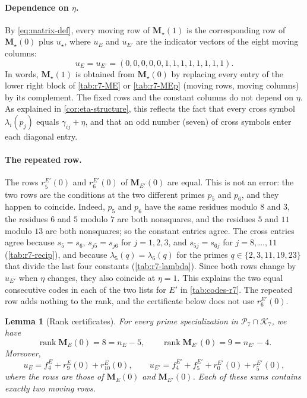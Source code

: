 \documentclass[12pt,oneside,openany]{book}
\theoremstyle{definition}
\theoremstyle{plain}
\numberwithin{equation}{chapter}
\theoremstyle{plain}
\newtheorem{lemma}[lemma]{Lemma}
\theoremstyle{definition}
\theoremstyle{remark}
\DeclareMathOperator{\rk}{rank}
\newcommand{\cP}{\mathcal P}
\newcommand{\cK}{\mathcal K}
\begin{document}
\paragraph{Dependence on $\eta$.}
By \eqref{eq:matrix-def}, every moving row of $\mathbf M_\star(1)$ is the
corresponding row of $\mathbf M_\star(0)$ plus $u_\star$, where $u_E$ and
$u_{E'}$ are the indicator vectors of the eight moving columns:
\[
 u_E=u_{E'}=(0,0,0,0,0,1,1,1,1,1,1,1,1).
\]
In words, $\mathbf M_\star(1)$ is obtained from $\mathbf M_\star(0)$ by
replacing every entry of the lower right block of \cref{tab:r7-ME} or
\cref{tab:r7-MEp} (moving rows, moving columns) by its complement. The
fixed rows and the constant columns do not depend on $\eta$. As explained
in \cref{cor:eta-structure}, this reflects the fact that every cross symbol
$\lambda_i(p_j)$ equals $\gamma_{ij}+\eta$, and that an odd number (seven)
of cross symbols enter each diagonal entry.

\paragraph{The repeated row.}
The rows $r^{E'}_5(0)$ and $r^{E'}_6(0)$ of $\mathbf M_{E'}(0)$ are equal. This is not
an error: the two rows are the conditions at the two different primes $p_5$
and $p_6$, and they happen to coincide. Indeed, $p_5$ and $p_6$ have the
same residues modulo $8$ and $3$, the residues $6$ and $5$ modulo $7$ are
both nonsquares, and the residues $5$ and $11$ modulo $13$ are both
nonsquares; so the constant entries agree. The cross entries agree because
$s_5=s_6$, $s_{j5}=s_{j6}$ for $j=1,2,3$, and $s_{5j}=s_{6j}$ for
$j=8,\dots,11$ (\cref{tab:r7-recip}), and because $\lambda_5(q)=\lambda_6(q)$
for the primes $q\in\{2,3,11,19,23\}$ that divide the last four constants
(\cref{tab:r7-lambda}). Since both rows change by $u_{E'}$ when $\eta$
changes, they also coincide at $\eta=1$. This explains the two equal
consecutive codes in each of the two lists for $E'$ in
\cref{tab:codes-r7}.
The repeated row adds nothing to the rank, and the certificate below does
not use $r^{E'}_6(0)$.

\begin{lemma}[Rank certificates]\label{lem:r7-ranks}
For every prime specialization in $\cP_7\cap\cK_7$, we have
\[
 \rk\mathbf M_E(0)=8=n_E-5,\qquad \rk\mathbf M_{E'}(0)=9=n_{E'}-4.
\]
Moreover,
\begin{equation}\label{r7:u-sums}
 u_E=f^E_4+r^E_9(0)+r^E_{10}(0),\qquad u_{E'}=f^{E'}_4+f^{E'}_5+r^{E'}_0(0)+r^{E'}_5(0),
\end{equation}
where the rows are those of $\mathbf M_E(0)$ and $\mathbf M_{E'}(0)$. Each
of these sums contains exactly two moving rows.
\end{lemma}
\end{document}
